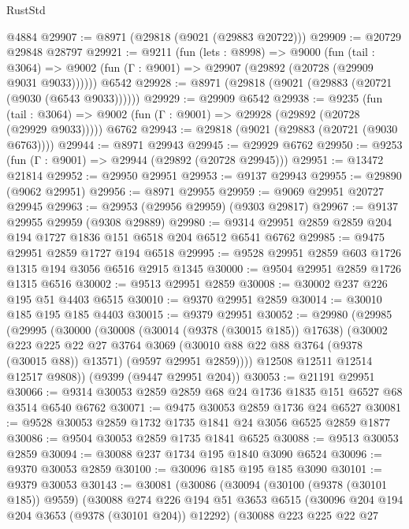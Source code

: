 \begin{lexlean}{RustStd}
\begin{coremodule}
    @4884
@29907 := @8971 (@29818 (@9021 (@29883 @20722)))
@29909 := @20729 @29848 @28797
@29921 := @9211
    (fun (lets : @8998) =>
    @9000
      (fun (tail : @3064) =>
      @9002 (fun (Γ : @9001) => @29907 (@29892 (@20728 (@29909 @9031 @9033))))))
    @6542
@29928 := @8971 (@29818 (@9021 (@29883 (@20721 (@9030 (@6543 @9033))))))
@29929 := @29909 @6542
@29938 := @9235
    (fun (tail : @3064) => @9002 (fun (Γ : @9001) => @29928 (@29892 (@20728 (@29929 @9033)))))
    @6762
@29943 := @29818 (@9021 (@29883 (@20721 (@9030 @6763))))
@29944 := @8971 @29943
@29945 := @29929 @6762
@29950 := @9253 (fun (Γ : @9001) => @29944 (@29892 (@20728 @29945)))
@29951 := @13472 @21814
@29952 := @29950 @29951
@29953 := @9137 @29943
@29955 := @29890 (@9062 @29951)
@29956 := @8971 @29955
@29959 := @9069 @29951 @20727 @29945
@29963 := @29953 (@29956 @29959) (@9303 @29817)
@29967 := @9137 @29955 @29959 (@9308 @29889)
@29980 := @9314 @29951 @2859 @2859 @204 @194 @1727 @1836 @151 @6518 @204 @6512 @6541 @6762
@29985 := @9475 @29951 @2859 @1727 @194 @6518
@29995 := @9528 @29951 @2859 @603 @1726 @1315 @194 @3056 @6516 @2915 @1345
@30000 := @9504 @29951 @2859 @1726 @1315 @6516
@30002 := @9513 @29951 @2859
@30008 := @30002 @237 @226 @195 @51 @4403 @6515
@30010 := @9370 @29951 @2859
@30014 := @30010 @185 @195 @185 @4403
@30015 := @9379 @29951
@30052 := @29980
    (@29985
      (@29995
        (@30000
          (@30008
            (@30014 (@9378 (@30015 @185)) @17638)
            (@30002
              @223
              @225
              @22
              @27
              @3764
              @3069
              (@30010 @88 @22 @88 @3764 (@9378 (@30015 @88)) @13571)
              (@9597 @29951 @2859))))
        @12508
        @12511
        @12514
        @12517
        @9808))
    (@9399 (@9447 @29951 @204))
@30053 := @21191 @29951
@30066 := @9314 @30053 @2859 @2859 @68 @24 @1736 @1835 @151 @6527 @68 @3514 @6540 @6762
@30071 := @9475 @30053 @2859 @1736 @24 @6527
@30081 := @9528 @30053 @2859 @1732 @1735 @1841 @24 @3056 @6525 @2859 @1877
@30086 := @9504 @30053 @2859 @1735 @1841 @6525
@30088 := @9513 @30053 @2859
@30094 := @30088 @237 @1734 @195 @1840 @3090 @6524
@30096 := @9370 @30053 @2859
@30100 := @30096 @185 @195 @185 @3090
@30101 := @9379 @30053
@30143 := @30081
    (@30086
      (@30094
        (@30100 (@9378 (@30101 @185)) @9559)
        (@30088
          @274
          @226
          @194
          @51
          @3653
          @6515
          (@30096 @204 @194 @204 @3653 (@9378 (@30101 @204)) @12292)
          (@30088
            @223
            @225
            @22
            @27

\end{coremodule}
\end{lexlean}
